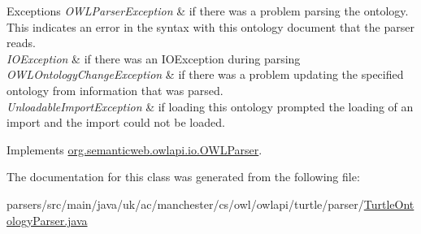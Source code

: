\begin{DoxyExceptions}{Exceptions}
{\em O\-W\-L\-Parser\-Exception} & if there was a problem parsing the ontology. This indicates an error in the syntax with this ontology document that the parser reads. \\
\hline
{\em I\-O\-Exception} & if there was an I\-O\-Exception during parsing \\
\hline
{\em O\-W\-L\-Ontology\-Change\-Exception} & if there was a problem updating the specified ontology from information that was parsed. \\
\hline
{\em Unloadable\-Import\-Exception} & if loading this ontology prompted the loading of an import and the import could not be loaded. \\
\hline
\end{DoxyExceptions}


Implements \hyperlink{interfaceorg_1_1semanticweb_1_1owlapi_1_1io_1_1_o_w_l_parser_a259739c6baf94f4e5a2dad5d0400f07a}{org.\-semanticweb.\-owlapi.\-io.\-O\-W\-L\-Parser}.



The documentation for this class was generated from the following file\-:\begin{DoxyCompactItemize}
\item 
parsers/src/main/java/uk/ac/manchester/cs/owl/owlapi/turtle/parser/\hyperlink{_turtle_ontology_parser_8java}{Turtle\-Ontology\-Parser.\-java}\end{DoxyCompactItemize}
